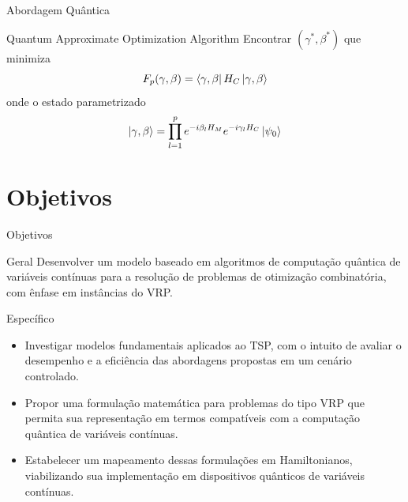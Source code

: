 \documentclass[xcolor={dvipsnames,table}]{beamer}
\begin{document}
\begin{frame}{Abordagem Quântica}

    \begin{block}{Quantum Approximate Optimization Algorithm}
        Encontrar $(\gamma^*,\beta^*)$ que minimiza
        $$
            F_p(\gamma,\beta)=\bra{\gamma,\beta}H_C\ket{\gamma,\beta}
        $$
        onde o estado parametrizado
        $$
            \ket{\gamma,\beta}=\prod_{l=1}^p e^{-i\beta_lH_M}e^{-i\gamma_lH_C}\ket{\psi_0}
        $$
    \end{block}
\end{frame}
\section{Objetivos}
\begin{frame}{Objetivos}
    \begin{block}{Geral}
        Desenvolver um modelo baseado em algoritmos de computação quântica de variáveis contínuas para a resolução de problemas de otimização combinatória, com ênfase em instâncias do VRP.
    
    \end{block}

    \begin{block}{Específico}
        \begin{itemize}
            
            \item Investigar modelos fundamentais aplicados ao TSP, com o intuito de avaliar o desempenho e a eficiência das abordagens propostas em um cenário controlado.
            
            \item Propor uma formulação matemática para problemas do tipo VRP que permita sua representação em termos compatíveis com a computação quântica de variáveis contínuas.
            
            \item Estabelecer um mapeamento dessas formulações em Hamiltonianos, viabilizando sua implementação em dispositivos quânticos de variáveis contínuas.
        \end{itemize}

    \end{block}

\end{frame}
\end{document}

